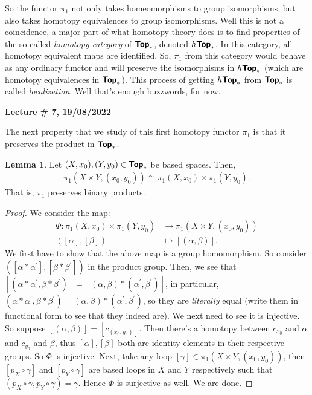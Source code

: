 \documentclass[letterpaper,11pt,twoside]{article}
\theoremstyle{definition}
\theoremstyle{definition}
\theoremstyle{definition}
\theoremstyle{definition}
\newtheorem{lemma}[proposition]{\textbf{Lemma}}
\theoremstyle{definition}
\theoremstyle{definition}
\theoremstyle{remark}
\theoremstyle{definition}
\newcommand{\cat}[1]{{\fontfamily{lmss}\selectfont 
		\text{\textbf{#1}}
}}
\newcommand{\isom}{\cong}
\newcommand{\newlecture}[2]{\begin{center}
    \textbf{Lecture \# #1, #2}
\end{center}}
\begin{document}
So the functor $\pi_1$ not only takes homeomorphisms to group isomorphisms, but also takes homotopy equivalences to group isomorphisms. Well this is not a coincidence, a major part of what homotopy theory does is to find properties of the so-called \textit{homotopy category} of $\cat{Top}_*$, denoted $h\cat{Top}_*$. In this category, all homotopy equivalent maps are identified. So, $\pi_1$ from this category would behave as any ordinary functor and will preserve the isomorphisms in $h\cat{Top}_*$ (which are homotopy equivalences in $\cat{Top}_*$). This process of getting $h\cat{Top}_*$ from $\cat{Top}_*$ is called \textit{localization}. Well that's enough buzzwords, for now.
\newlecture{7}{19/08/2022}
The next property that we study of this first homotopy functor $\pi_1$ is that it preserves the product in $\cat{Top}_*$.
\begin{lemma}\label{L-4.2.3}
Let $(X,x_0),(Y,y_0)\in \cat{Top}_*$ be based spaces. Then, \begin{align*}
    \pi_1(X\times Y, (x_0,y_0)) \isom \pi_1(X,x_0) \times \pi_1(Y,y_0).
\end{align*}
That is, $\pi_1$ preserves binary products.
\end{lemma}
\begin{proof}
We consider the map:
\begin{align*}
    \Phi : \pi_1(X,x_0) \times \pi_1(Y,y_0) &\longrightarrow \pi_1(X\times Y, (x_0,y_0))\\
    ([\alpha],[\beta])&\longmapsto [(\alpha,\beta)].
\end{align*}
We first have to show that the above map is a group homomorphism. So consider $([\alpha*\alpha^\prime],[\beta*\beta^\prime])$ in the product group. Then, we see that $[(\alpha*\alpha^\prime, \beta*\beta^\prime)]=[(\alpha,\beta)*(\alpha^\prime,\beta^\prime)]$, in particular, $(\alpha*\alpha^\prime, \beta*\beta^\prime) = (\alpha,\beta)*(\alpha^\prime,\beta^\prime)$, so they are \textit{literally} equal (write them in functional form to see that they indeed are). We next need to see it is injective. So suppose $[(\alpha,\beta)] = [c_{(x_0,y_0)}]$. Then there's a homotopy between $c_{x_0}$ and $\alpha$ and $c_{y_0}$ and $\beta$, thus $[\alpha],[\beta]$ both are identity elements in their respective groups. So $\Phi $ is injective. Next, take any loop $[\gamma]\in \pi_1(X\times Y,(x_0,y_0))$, then $[p_X\circ \gamma]$ and $[p_Y\circ \gamma]$ are based loops in $X$ and $Y$ respectively such that $(p_X\circ \gamma, p_Y\circ \gamma) = \gamma$. Hence $\Phi$ is surjective as well. We are done. 
\end{proof}
\end{document}
